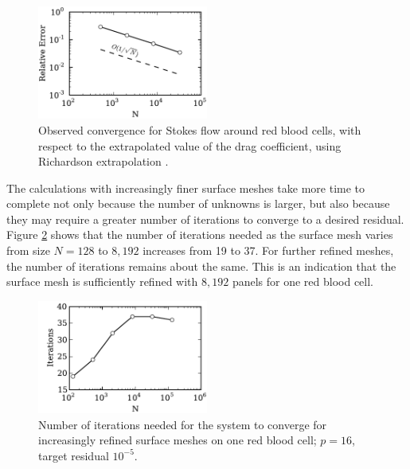 \documentclass[final,leqno,]{siamltex1213}
\begin{document}
\begin{figure}
\begin{center}
	\includegraphics[natwidth=3in,natheight=2in,width=0.5\textwidth]{EthrocyteConvergence.pdf}
	\caption{Observed convergence for Stokes flow around red blood cells, with respect to the extrapolated value of the drag coefficient, using Richardson extrapolation \cite{roache1998}.}
	\label{fig:rbc_extrapolated_convergence}
\end{center}
\end{figure}


The calculations with increasingly finer surface meshes take more time to complete not only because the number of unknowns is larger, but also because they may require a greater number of iterations to converge to a desired residual.
Figure \ref{fig:single_cell_iterations} shows that the number of iterations needed as the surface mesh varies from size $N=128$ to $8,192$ increases from 19 to 37. For further refined meshes, the number of iterations remains about the same. This is an indication that the surface mesh is sufficiently refined with $8,192$ panels for one red blood cell.

\begin{figure}
\begin{center}
	\includegraphics[natwidth=3in,natheight=2in,width=0.5\textwidth]{EthrocyteSingleCellIterations.pdf}
	\caption{Number of iterations needed for the system to converge for increasingly refined surface meshes on one red blood cell; $p = 16$, target residual $10^{-5}$.}
	\label{fig:single_cell_iterations}
\end{center}
\end{figure}
\end{document}
